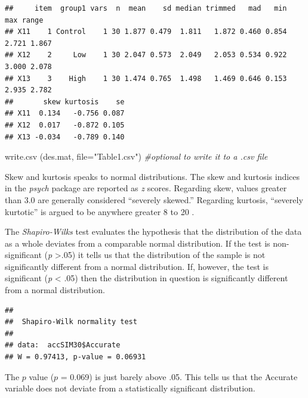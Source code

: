\documentclass[
  english,
]{book}
\newenvironment{Shaded}{\begin{snugshade}}{\end{snugshade}}
\newcommand{\AttributeTok}[1]{\textcolor[rgb]{0.77,0.63,0.00}{#1}}
\newcommand{\CommentTok}[1]{\textcolor[rgb]{0.56,0.35,0.01}{\textit{#1}}}
\newcommand{\FunctionTok}[1]{\textcolor[rgb]{0.00,0.00,0.00}{#1}}
\newcommand{\NormalTok}[1]{#1}
\newcommand{\SpecialCharTok}[1]{\textcolor[rgb]{0.00,0.00,0.00}{#1}}
\newcommand{\StringTok}[1]{\textcolor[rgb]{0.31,0.60,0.02}{#1}}
\begin{document}
\begin{verbatim}
##     item  group1 vars  n  mean    sd median trimmed   mad   min   max range
## X11    1 Control    1 30 1.877 0.479  1.811   1.872 0.460 0.854 2.721 1.867
## X12    2     Low    1 30 2.047 0.573  2.049   2.053 0.534 0.922 3.000 2.078
## X13    3    High    1 30 1.474 0.765  1.498   1.469 0.646 0.153 2.935 2.782
##       skew kurtosis    se
## X11  0.134   -0.756 0.087
## X12  0.017   -0.872 0.105
## X13 -0.034   -0.789 0.140
\end{verbatim}

\begin{Shaded}
\begin{Highlighting}[]
\FunctionTok{write.csv}\NormalTok{ (des.mat, }\AttributeTok{file=}\StringTok{"Table1.csv"}\NormalTok{) }\CommentTok{\#optional to write it to a .csv file}
\end{Highlighting}
\end{Shaded}

Skew and kurtosis speaks to normal distributions. The skew and kurtosis indices in the \emph{psych} package are reported as \emph{z} scores. Regarding skew, values greater than 3.0 are generally considered ``severely skewed.'' Regarding kurtosis, ``severely kurtotic'' is argued to be anywhere greater 8 to 20 \citep{kline_principles_2016}.

The \emph{Shapiro-Wilks} test evaluates the hypothesis that the distribution of the data as a whole deviates from a comparable normal distribution. If the test is non-significant (\emph{p} \textgreater.05) it tells us that the distribution of the sample is not significantly different from a normal distribution. If, however, the test is significant (\emph{p} \textless{} .05) then the distribution in question is significantly different from a normal distribution.

\begin{Shaded}
\end{Shaded}

\begin{verbatim}
## 
##  Shapiro-Wilk normality test
## 
## data:  accSIM30$Accurate
## W = 0.97413, p-value = 0.06931
\end{verbatim}

The \(p\) value (\(p\) = 0.069) is just barely above .05. This tells us that the Accurate variable does not deviate from a statistically significant distribution.
\end{document}
